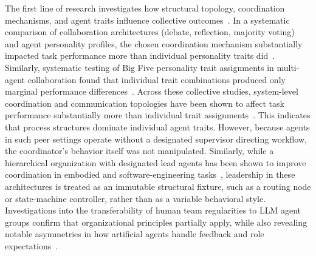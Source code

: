 The first line of research investigates how structural topology, coordination mechanisms, and agent traits influence collective outcomes~\cite{zhang2024exploringcollaborationmechanismsllm, guo2024embodiedllmagentslearn, muralidharan2025lessonshumanteamsapplied, chen2023agentversefacilitatingmultiagentcollaboration}.
In a systematic comparison of collaboration architectures (debate, reflection, majority voting) and agent personality profiles, the chosen coordination mechanism substantially impacted task performance more than individual personality traits did~\cite{zhang2024exploringcollaborationmechanismsllm}.
Similarly, systematic testing of Big Five personality trait assignments in multi-agent collaboration found that individual trait combinations produced only marginal performance differences~\cite{duan2025powerpersonalityhumansimulation}.
Across these collective studies, system-level coordination and communication topologies have been shown to affect task performance substantially more than individual trait assignments~\cite{muralidharan2025lessonshumanteamsapplied, zhang2024cutcrapeconomicalcommunication}.
This indicates that process structures dominate individual agent traits.
However, because agents in such peer settings operate without a designated supervisor directing workflow, the coordinator's behavior itself was not manipulated.
Similarly, while a hierarchical organization with designated lead agents has been shown to improve coordination in embodied and software-engineering tasks~\cite{guo2024embodiedllmagentslearn, qian2024chatdevcommunicativeagentssoftware, hong2024metagptmetaprogrammingmultiagent}, 
leadership in these architectures is treated as an immutable structural fixture, such as a routing node or state-machine controller, rather than as a variable behavioral style.
Investigations into the transferability of human team regularities to \ac{LLM} agent groups confirm that organizational principles partially apply, while also revealing notable asymmetries in how artificial agents handle feedback and role expectations~\cite{muralidharan2025lessonshumanteamsapplied}.

